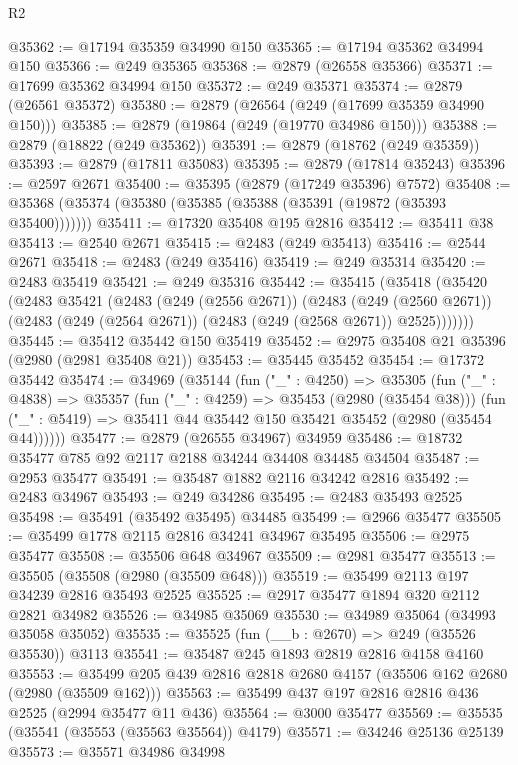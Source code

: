 \begin{lexlean}{R2}
\begin{coremodule}
@35362 := @17194 @35359 @34990 @150
@35365 := @17194 @35362 @34994 @150
@35366 := @249 @35365
@35368 := @2879 (@26558 @35366)
@35371 := @17699 @35362 @34994 @150
@35372 := @249 @35371
@35374 := @2879 (@26561 @35372)
@35380 := @2879 (@26564 (@249 (@17699 @35359 @34990 @150)))
@35385 := @2879 (@19864 (@249 (@19770 @34986 @150)))
@35388 := @2879 (@18822 (@249 @35362))
@35391 := @2879 (@18762 (@249 @35359))
@35393 := @2879 (@17811 @35083)
@35395 := @2879 (@17814 @35243)
@35396 := @2597 @2671
@35400 := @35395 (@2879 (@17249 @35396) @7572)
@35408 := @35368 (@35374 (@35380 (@35385 (@35388 (@35391 (@19872 (@35393 @35400)))))))
@35411 := @17320 @35408 @195 @2816
@35412 := @35411 @38
@35413 := @2540 @2671
@35415 := @2483 (@249 @35413)
@35416 := @2544 @2671
@35418 := @2483 (@249 @35416)
@35419 := @249 @35314
@35420 := @2483 @35419
@35421 := @249 @35316
@35442 := @35415
    (@35418
      (@35420
        (@2483
          @35421
          (@2483
            (@249 (@2556 @2671))
            (@2483
              (@249 (@2560 @2671))
              (@2483 (@249 (@2564 @2671)) (@2483 (@249 (@2568 @2671)) @2525)))))))
@35445 := @35412 @35442 @150 @35419
@35452 := @2975 @35408 @21 @35396 (@2980 (@2981 @35408 @21))
@35453 := @35445 @35452
@35454 := @17372 @35442
@35474 := @34969
    (@35144
      (fun ("_" : @4250) =>
      @35305
        (fun ("_" : @4838) =>
        @35357
          (fun ("_" : @4259) => @35453 (@2980 (@35454 @38)))
          (fun ("_" : @5419) => @35411 @44 @35442 @150 @35421 @35452 (@2980 (@35454 @44))))))
@35477 := @2879 (@26555 @34967) @34959
@35486 := @18732 @35477 @785 @92 @2117 @2188 @34244 @34408 @34485 @34504
@35487 := @2953 @35477
@35491 := @35487 @1882 @2116 @34242 @2816
@35492 := @2483 @34967
@35493 := @249 @34286
@35495 := @2483 @35493 @2525
@35498 := @35491 (@35492 @35495) @34485
@35499 := @2966 @35477
@35505 := @35499 @1778 @2115 @2816 @34241 @34967 @35495
@35506 := @2975 @35477
@35508 := @35506 @648 @34967
@35509 := @2981 @35477
@35513 := @35505 (@35508 (@2980 (@35509 @648)))
@35519 := @35499 @2113 @197 @34239 @2816 @35493 @2525
@35525 := @2917 @35477 @1894 @320 @2112 @2821 @34982
@35526 := @34985 @35069
@35530 := @34989 @35064 (@34993 @35058 @35052)
@35535 := @35525 (fun (__b : @2670) => @249 (@35526 @35530)) @3113
@35541 := @35487 @245 @1893 @2819 @2816 @4158 @4160
@35553 := @35499 @205 @439 @2816 @2818 @2680 @4157 (@35506 @162 @2680 (@2980 (@35509 @162)))
@35563 := @35499 @437 @197 @2816 @2816 @436 @2525 (@2994 @35477 @11 @436)
@35564 := @3000 @35477
@35569 := @35535 (@35541 (@35553 (@35563 @35564)) @4179)
@35571 := @34246 @25136 @25139
@35573 := @35571 @34986 @34998

\end{coremodule}
\end{lexlean}
